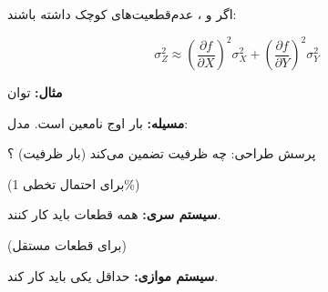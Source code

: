 \begin{Shaded}
\begin{Highlighting}[]
 \OperatorTok{=} \OperatorTok{;}
 \OperatorTok{=} \NormalTok{(}\NormalTok{(} \OperatorTok{{-}} \NormalTok{) }\OperatorTok{\textless{}} \OperatorTok{*}\NormalTok{)}\OperatorTok{;}
\NormalTok{(}\OperatorTok{,} \OperatorTok{*}\NormalTok{)}\OperatorTok{;}
\end{Highlighting}
\end{Shaded}


اگر  و ،  عدم‌قطعیت‌های کوچک داشته باشند:

\[\sigma_Z^2 \approx \left(\frac{\partial f}{\partial X}\right)^2 \sigma_X^2 + \left(\frac{\partial f}{\partial Y}\right)^2 \sigma_Y^2\]

\textbf{مثال:} توان 



\textbf{مسیله:} بار اوج نامعین است. مدل: 

پرسش طراحی: چه ظرفیت  تضمین می‌کند (بار \lr{\textgreater{}} ظرفیت) ؟

 (برای احتمال تخطی 1\%)


\textbf{سیستم سری:} همه قطعات باید کار کنند.

 (برای قطعات مستقل)

\textbf{سیستم موازی:} حداقل یکی باید کار کند.

